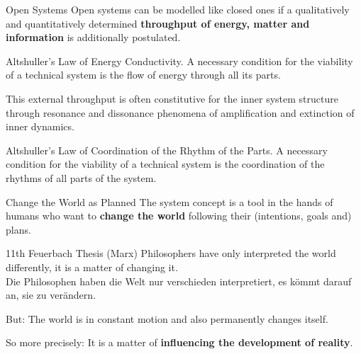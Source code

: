 \documentclass{beamer}
\begin{document}
\begin{frame}{Open Systems}
Open systems can be modelled like closed ones if a qualitatively and
quantitatively determined \textbf{throughput of energy, matter and
  information} is additionally postulated.

\begin{block}{Altshuller's Law of Energy Conductivity.}
  A necessary condition for the viability of a technical system is the flow of
  energy through all its parts.
\end{block}

This external throughput is often constitutive for the inner system structure
through resonance and dissonance phenomena of amplification and extinction of
inner dynamics.

\begin{block}{Altshuller's Law of Coordination of the Rhythm of the Parts.}
  A necessary condition for the viability of a technical system is the
  coordination of the rhythms of all parts of the system.
\end{block}
\end{frame}

\begin{frame}{Change the World as Planned}
The system concept is a tool in the hands of humans who want to \textbf{change
  the world} following their (intentions, goals and) plans.

\begin{block}{11th Feuerbach Thesis (Marx)}
  Philosophers have only interpreted the world differently, it is a matter of
  changing it.\\[4pt] Die Philosophen haben die Welt nur verschieden
  interpretiert, es kömmt darauf an, sie zu verändern.
\end{block}

But: The world is in constant motion and also permanently changes itself.

So more precisely: It is a matter of \textbf{influencing the development of
  reality}.
\end{frame}
\end{document}
